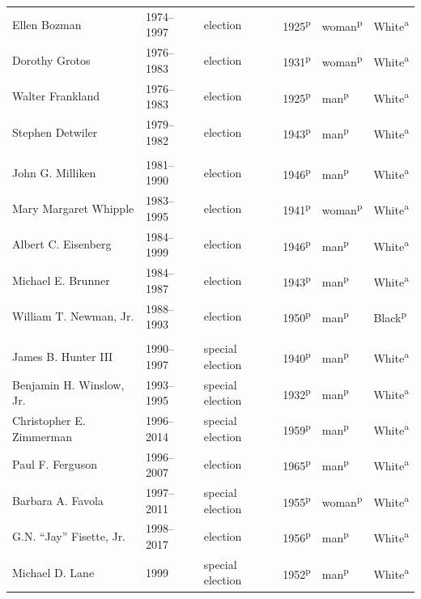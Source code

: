 \begin{longtable}{Q}
Ellen Bozman & 1974--1997 & election & 1925\textsuperscript{p} & woman\textsuperscript{p} & White\textsuperscript{a} \\
Dorothy Grotos & 1976--1983 & election & 1931\textsuperscript{p} & woman\textsuperscript{p} & White\textsuperscript{a} \\
Walter Frankland & 1976--1983 & election & 1925\textsuperscript{p} & man\textsuperscript{p} & White\textsuperscript{a} \\*
Stephen Detwiler & 1979--1982 & election & 1943\textsuperscript{p} & man\textsuperscript{p} & White\textsuperscript{a} \\
\addlinespace[1.4ex]
 \\*
John G. Milliken & 1981--1990 & election & 1946\textsuperscript{p} & man\textsuperscript{p} & White\textsuperscript{a} \\*
Mary Margaret Whipple & 1983--1995 & election & 1941\textsuperscript{p} & woman\textsuperscript{p} & White\textsuperscript{a} \\
Albert C. Eisenberg & 1984--1999 & election & 1946\textsuperscript{p} & man\textsuperscript{p} & White\textsuperscript{a} \\
Michael E. Brunner & 1984--1987 & election & 1943\textsuperscript{p} & man\textsuperscript{p} & White\textsuperscript{a} \\*
William T. Newman, Jr. & 1988--1993 & election & 1950\textsuperscript{p} & man\textsuperscript{p} & Black\textsuperscript{p} \\
\addlinespace[1.4ex]
 \\*
James B. Hunter III & 1990--1997 & special election & 1940\textsuperscript{p} & man\textsuperscript{p} & White\textsuperscript{a} \\*
Benjamin H. Winslow, Jr. & 1993--1995 & special election & 1932\textsuperscript{p} & man\textsuperscript{p} & White\textsuperscript{a} \\
Christopher E. Zimmerman & 1996--2014 & special election & 1959\textsuperscript{p} & man\textsuperscript{p} & White\textsuperscript{a} \\
Paul F. Ferguson & 1996--2007 & election & 1965\textsuperscript{p} & man\textsuperscript{p} & White\textsuperscript{a} \\
Barbara A. Favola & 1997--2011 & special election & 1955\textsuperscript{p} & woman\textsuperscript{p} & White\textsuperscript{a} \\
G.N. “Jay” Fisette, Jr. & 1998--2017 & election & 1956\textsuperscript{p} & man\textsuperscript{p} & White\textsuperscript{a} \\*
Michael D. Lane & 1999 & special election & 1952\textsuperscript{p} & man\textsuperscript{p} & White\textsuperscript{a} \\
\end{longtable}\par
